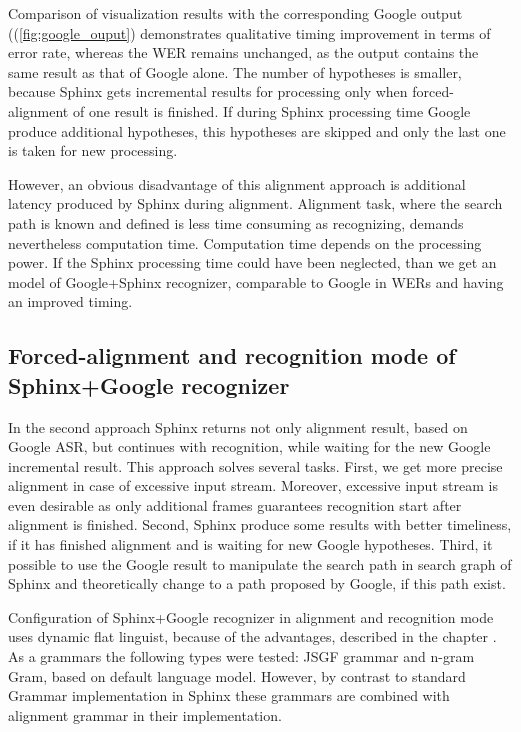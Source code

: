 Comparison of visualization results with the corresponding Google
output ((\ref{fig:google_ouput}) demonstrates qualitative timing improvement in terms
of error rate, whereas the WER remains unchanged, as the output contains the
same result as that of Google alone. The number of hypotheses is smaller,
because Sphinx gets incremental results for processing only when
forced-alignment of one result is finished.  If during Sphinx processing time
Google produce additional hypotheses, this hypotheses are skipped and only the
last one is taken for new processing. 

However, an obvious disadvantage of this alignment approach is additional
latency produced by Sphinx during alignment.
Alignment task, where the search path is known and defined is less time
consuming as recognizing, demands nevertheless computation time.  Computation
time depends on the processing power. If the Sphinx processing time could have
been neglected, than we get an model of Google+Sphinx recognizer,
comparable to Google in WERs and having an improved timing.

\subsection {Forced-alignment and recognition mode  of Sphinx+Google recognizer}

In the second approach Sphinx returns not only alignment result, based on Google
ASR, but continues with recognition, while waiting for the new Google incremental result. 
This approach solves several tasks. First, we get more precise alignment  in
case of excessive input stream. Moreover, excessive input stream is
even desirable as only additional frames guarantees recognition start after
alignment is finished. Second, Sphinx produce some results with better
timeliness, if it has finished alignment and is waiting for new Google
hypotheses. Third, it possible to use the Google result to manipulate the search
path in search graph of Sphinx and theoretically change to a path proposed by
Google, if this path exist. 

Configuration of Sphinx+Google recognizer in alignment and recognition mode
uses dynamic flat linguist, because of the  advantages, described in the chapter
\label{ref:sphinx}. As a grammars the following types were tested: JSGF grammar
and n-gram Gram, based on default language model.  However, by contrast to standard Grammar
implementation in Sphinx these grammars are combined with alignment grammar in
their implementation.


